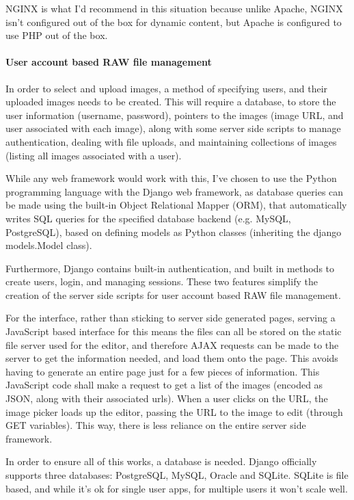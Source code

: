 \documentclass[12pt,a4paper]{article}
\begin{document}
NGINX is what I'd recommend in this situation because unlike Apache, NGINX isn't
configured out of the box for dynamic content, but Apache is configured to use PHP
out of the box.

\paragraph{User account based RAW file management}
In order to select and upload images, a method of specifying users, and their uploaded
images needs to be created. This will require a database, to store the user information (username,
password), pointers to the images (image URL, and user associated with each image), along with some
server side scripts to manage authentication, dealing with file uploads, and maintaining collections
of images (listing all images associated with a user).

While any web framework would work with this, I've chosen to use the Python programming
language with the Django web framework, as database queries can be made using the built-in
Object Relational Mapper (ORM), that automatically writes SQL queries for the specified
database backend (e.g. MySQL, PostgreSQL), based on defining models as Python classes (inheriting
the django models.Model class).

Furthermore, Django contains built-in authentication, and built in methods to create users,
login, and managing sessions. These two features simplify the creation of the server side scripts
for user account based RAW file management.

For the interface, rather than sticking to server side generated pages, serving a JavaScript based
interface for this means the files can all be stored on the static file server used for the editor,
and therefore AJAX requests can be made to the server to get the information needed, and load them
onto the page. This avoids having to generate an entire page just for a few pieces of information. This
JavaScript code shall make a request to get a list of the images (encoded as JSON, along with their associated
urls). When a user clicks on the URL, the image picker loads up the editor, passing the URL to the image to edit (through
GET variables). This way, there is less reliance on the entire server side framework.

In order to ensure all of this works, a database is needed. Django officially supports three databases:
PostgreSQL, MySQL, Oracle and SQLite. SQLite is file based, and while it's ok for single user apps, for
multiple users it won't scale well.
\end{document}
